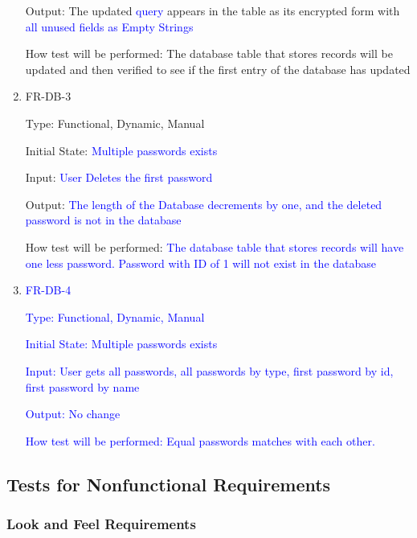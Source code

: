 \documentclass[12pt, titlepage]{article}
\begin{document}
\begin{enumerate}
Output: The updated \textcolor{blue}{query} appears in the table as its encrypted form with \textcolor{blue}{all unused fields as Empty Strings}

How test will be performed: The database table that stores records will be updated and then verified to see if the first entry of the database has updated

\item{FR-DB-3\\}

Type: Functional, Dynamic, Manual

Initial State: \textcolor{blue}{Multiple passwords exists}

Input: \textcolor{blue}{User Deletes the first password}

Output: \textcolor{blue}{The length of the Database decrements by one, and the deleted password is not in the database}

How test will be performed: \textcolor{blue}{The database table that stores records will have one less password. Password with ID of 1 will not exist in the database}

\item{\textcolor{blue}{FR-DB-4}\\}

\textcolor{blue}{Type: Functional, Dynamic, Manual

Initial State: Multiple passwords exists

Input: User gets all passwords, all passwords by type, first password by id, first password by name

Output: No change

How test will be performed: Equal passwords matches with each other.} 
\end{enumerate}

\subsection{Tests for Nonfunctional Requirements}

\subsubsection{Look and Feel Requirements}
\end{document}
